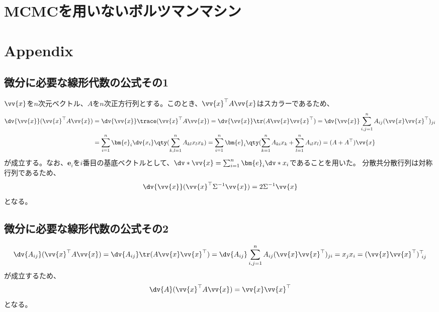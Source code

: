 \documentclass[a4paper,11pt,uplatex]{jsarticle}%
\begin{document}
\section{MCMCを用いないボルツマンマシン}


\newpage
\section{Appendix}

\subsection{微分に必要な線形代数の公式その1}
$\vv{x}$を$n$次元ベクトル、$A$を$n$次正方行列とする。このとき、$\vv{x}^{\top}A\vv{x}$はスカラーであるため、
\begin{align}
  \dv{\vv{x}}(\vv{x}^{\top}A\vv{x}) & = \dv{\vv{x}}\trace(\vv{x}^{\top}A\vv{x}) = \dv{\vv{x}}\tr(A\vv{x}\vv{x}^{\top})
  = \dv{\vv{x}}\sum_{i,j=1}^{n}A_{ij}(\vv{x}\vv{x}^{\top})_{ji} \notag                                                 \\
                                    & = \sum_{i=1}^{n}\bm{e}_{i}\dv{x_i}\qty(\sum_{k,l=1}^{n}A_{kl}x_lx_k)
  = \sum_{i=1}^{n}\bm{e}_{i}\qty(\sum_{k=1}^{n}A_{ki}x_k + \sum_{l=1}^{n}A_{il}x_l) = (A+A^{\top})\vv{x}
\end{align}
が成立する。なお、$\bm{e}_i$を$i$番目の基底ベクトルとして、$\dv*{\vv{x}} = \sum_{i=1}^{n}\bm{e}_i\dv*{x_i}$であることを用いた。
分散共分散行列は対称行列であるため、
\begin{equation}
  \dv{\vv{x}}(\vv{x}^{\top}\Sigma^{-1}\vv{x}) = 2\Sigma^{-1}\vv{x}
\end{equation}
となる。
\subsection{微分に必要な線形代数の公式その2}
\begin{equation}
  \dv{A_{ij}}(\vv{x}^{\top}A\vv{x})  = \dv{A_{ij}}\tr(A\vv{x}\vv{x}^{\top})
  = \dv{A_{ij}}\sum_{i,j=1}^{n}A_{ij}(\vv{x}\vv{x}^{\top})_{ji} = x_jx_i = (\vv{x}\vv{x}^{\top})^{\top}_{~ij}
\end{equation}
が成立するため、
\begin{equation}
  \dv{A}(\vv{x}^{\top}A\vv{x})  = \vv{x}\vv{x}^{\top}
\end{equation}
となる。
\end{document}
